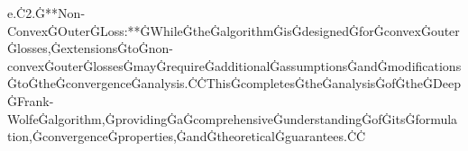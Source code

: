 e.Ċ2.Ġ**Non-ConvexĠOuterĠLoss:**ĠWhileĠtheĠalgorithmĠisĠdesignedĠforĠconvexĠouterĠlosses,ĠextensionsĠtoĠnon-convexĠouterĠlossesĠmayĠrequireĠadditionalĠassumptionsĠandĠmodificationsĠtoĠtheĠconvergenceĠanalysis.ĊĊThisĠcompletesĠtheĠanalysisĠofĠtheĠDeepĠFrank-WolfeĠalgorithm,ĠprovidingĠaĠcomprehensiveĠunderstandingĠofĠitsĠformulation,ĠconvergenceĠproperties,ĠandĠtheoreticalĠguarantees.ĊĊ%